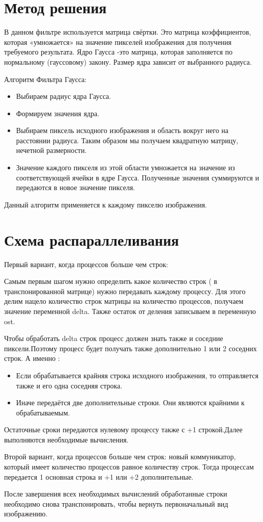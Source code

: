 \documentclass{report}
\begin{document}
\section*{Метод решения}
В данном фильтре используется матрица свёртки. Это матрица коэффициентов, которая «умножается» на значение пикселей изображения для получения требуемого результата. Ядро Гаусса -это матрица, которая заполняется по нормальному (гауссовому) закону. Размер ядра зависит от выбранного радиуса.
\par Алгоритм Фильтра Гаусса:
\begin{itemize}
\item Выбираем радиус ядра Гаусса.
\item Формируем значения ядра.
\item Выбираем пиксель исходного изображения и область вокруг него на расстоянии радиуса. Таким образом мы получаем квадратную матрицу, нечетной размерности.
\item Значение каждого пикселя из этой области умножается на значение из соответствующей ячейки в ядре Гаусса. Полученные значения суммируются и передаются в новое значение пикселя.
\end{itemize}
\par Данный алгоритм применяется к каждому пикселю изображения.
\newpage

\section*{Схема распараллеливания}
 Первый вариант, когда процессов больше чем строк:
\par Самым первым шагом нужно определить какое количество строк ( в транспонированной матрице) нужно передавать каждому процессу. Для этого делим нацело количество строк матрицы на количество процессов, получаем значение переменной delta. Также остаток от деления записываем в переменную ost.
\par Чтобы обработать delta строк процесс должен знать также и соседние пиксели.Поэтому процесс будет получать также дополнительно 1 или 2 соседних строк. А именно :
\begin{itemize}
\item Если обрабатывается крайняя строка исходного изображения, то отправляется  также и его одна соседняя строка.
\item Иначе передаётся две дополнительные строки. Они являются крайними к обрабатываемым.
\end{itemize}
\par Остаточные сроки передаются нулевому процессу также с +1 строкой.Далее выполняются необходимые вычисления.
\par Второй вариант, когда процессов больше чем строк:
 новый коммуникатор, который имеет количество процессов равное количеству строк. Тогда процессам передается 1 основная строка и +1 или +2 дополнительные.
\par После завершения всех необходимых вычислений обработанные строки необходимо снова транспонировать, чтобы вернуть первоначальный вид изображению.
\newpage
\end{document}
